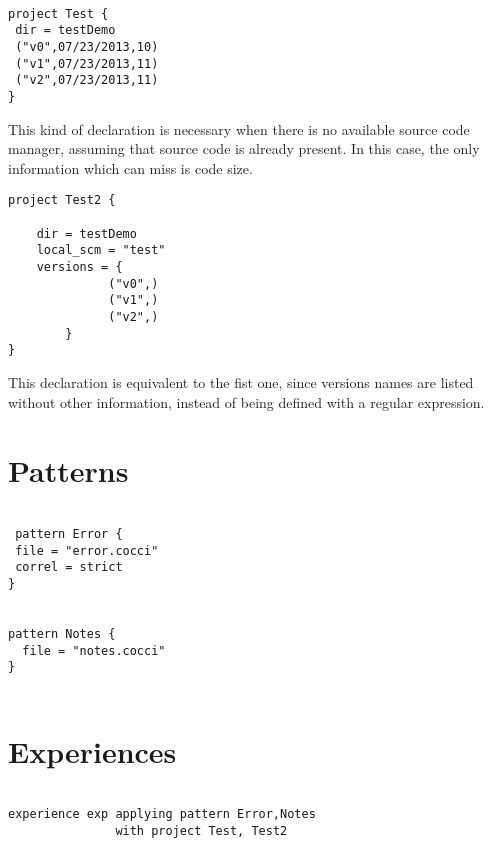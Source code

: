 \begin{lstlisting}
 
project Test {
 dir = testDemo	
 ("v0",07/23/2013,10)
 ("v1",07/23/2013,11)
 ("v2",07/23/2013,11)
}
\end{lstlisting}
This kind of declaration is necessary when there is no available source code manager, assuming that source code
is already present. In this case, the only information which can miss is code size.

\begin{lstlisting}
project Test2 {
	
	dir = testDemo
	local_scm = "test"
	versions = {
              ("v0",)
              ("v1",)
              ("v2",)
        }
}
\end{lstlisting}
This declaration is equivalent to the fist one, since versions names are listed without other information, instead of
being defined with a regular expression.

\section{Patterns}
\label{sec:ex-patterns}


\begin{lstlisting}
 
 pattern Error {
 file = "error.cocci"
 correl = strict
}


pattern Notes {
  file = "notes.cocci"
}
 
\end{lstlisting}

\section{Experiences}
\label{sec:ex-experiences}


\begin{lstlisting}

experience exp applying pattern Error,Notes
               with project Test, Test2		


\end{lstlisting}


